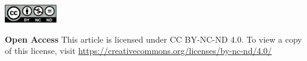 \vspace{8mm}
\noindent
\includegraphics[height=8mm]{licenses/by-nc-nd}

\begin{spacing}{.6}
\noindent
\textbf{Open Access} This article is licensed under CC BY-NC-ND 4.0. To view a copy of this license, visit \url{https://creativecommons.org/licenses/by-nc-nd/4.0/}
\end{spacing}